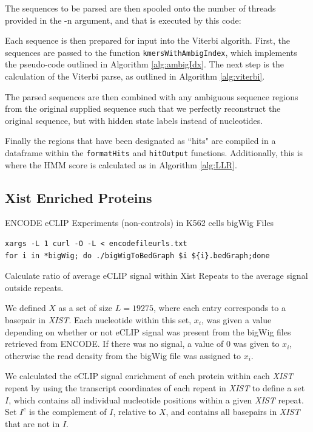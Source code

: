 The sequences to be parsed are then spooled onto the number of threads provided in the -n argument, and that is executed by this code:



Each sequence is then prepared for input into the Viterbi algorith. First, the sequences are passed to the function \texttt{kmersWithAmbigIndex}, which implements the pseudo-code outlined in Algorithm \ref{alg:ambigIdx}. The next step is the calculation of the Viterbi parse, as outlined in Algorithm \ref{alg:viterbi}. 



The parsed sequences are then combined with any ambiguous sequence regions from the original supplied sequence such that we perfectly reconstruct the original sequence, but with hidden state labels instead of nucleotides. 

Finally the regions that have been designated as ``hits" are compiled in a dataframe within the \texttt{formatHits} and \texttt{hitOutput} functions. Additionally, this is where the HMM score is calculated as in Algorithm \ref{alg:LLR}. 

\subsection{Xist Enriched Proteins}

ENCODE eCLIP Experiments (non-controls) in K562 cells bigWig Files
\begin{verbatim}
xargs -L 1 curl -O -L < encodefileurls.txt
for i in *bigWig; do ./bigWigToBedGraph $i ${i}.bedGraph;done
\end{verbatim}



Calculate ratio of average eCLIP signal within Xist Repeats to the average signal outside repeats. 

We defined $X$ as a set of size $L = 19275$, where each entry corresponds to a basepair in \emph{XIST}. Each nucleotide within this set, $x_i$, was given a value depending on whether or not eCLIP signal was present from the bigWig files retrieved from ENCODE. If there was no signal, a value of 0 was given to $x_i$, otherwise the read density from the bigWig file was assigned to $x_i$.

We calculated the eCLIP signal enrichment of each protein within each \emph{XIST} repeat by using the transcript coordinates of each repeat in \emph{XIST} to define a set $I$, which contains all individual nucleotide positions within a given \emph{XIST} repeat. Set $I^c$ is the complement of $I$, relative to $X$,  and contains all basepairs in \emph{XIST} that are not in $I$. 


